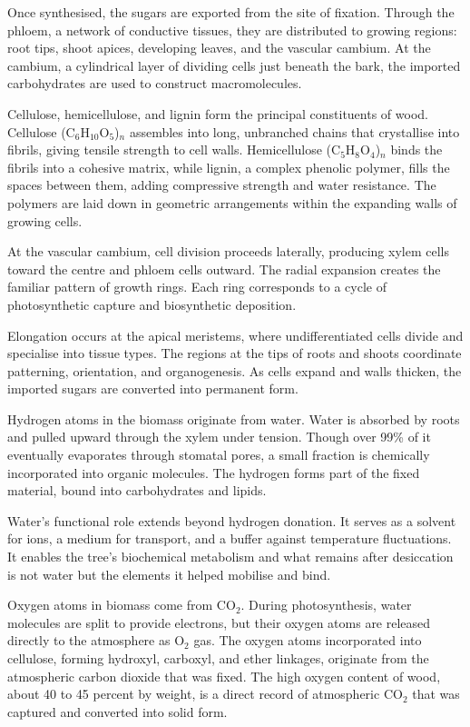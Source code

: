 Once synthesised, the sugars are exported from the site of fixation. Through the phloem, a network of conductive tissues, they are distributed to growing regions: root tips, shoot apices, developing leaves, and the vascular cambium. At the cambium, a cylindrical layer of dividing cells just beneath the bark, the imported carbohydrates are used to construct macromolecules.

Cellulose, hemicellulose, and lignin form the principal constituents of wood. Cellulose (C\(_6\)H\(_{10}\)O\(_5\))\(_n\) assembles into long, unbranched chains that crystallise into fibrils, giving tensile strength to cell walls. Hemicellulose (C\(_5\)H\(_{8}\)O\(_4\))\(_n\) binds the fibrils into a cohesive matrix, while lignin, a complex phenolic polymer, fills the spaces between them, adding compressive strength and water resistance. The polymers are laid down in geometric arrangements within the expanding walls of growing cells.

At the vascular cambium, cell division proceeds laterally, producing xylem cells toward the centre and phloem cells outward. The radial expansion creates the familiar pattern of growth rings. Each ring corresponds to a cycle of photosynthetic capture and biosynthetic deposition.

Elongation occurs at the apical meristems, where undifferentiated cells divide and specialise into tissue types. The regions at the tips of roots and shoots coordinate patterning, orientation, and organogenesis. As cells expand and walls thicken, the imported sugars are converted into permanent form.

Hydrogen atoms in the biomass originate from water. Water is absorbed by roots and pulled upward through the xylem under tension. Though over 99\% of it eventually evaporates through stomatal pores, a small fraction is chemically incorporated into organic molecules. The hydrogen forms part of the fixed material, bound into carbohydrates and lipids.

Water's functional role extends beyond hydrogen donation. It serves as a solvent for ions, a medium for transport, and a buffer against temperature fluctuations. It enables the tree's biochemical metabolism and what remains after desiccation is not water but the elements it helped mobilise and bind.

Oxygen atoms in biomass come from \(\mathrm{CO}_2\). During photosynthesis, water molecules are split to provide electrons, but their oxygen atoms are released directly to the atmosphere as \(\mathrm{O}_2\) gas. The oxygen atoms incorporated into cellulose, forming hydroxyl, carboxyl, and ether linkages, originate from the atmospheric carbon dioxide that was fixed. The high oxygen content of wood, about 40 to 45 percent by weight, is a direct record of atmospheric \(\mathrm{CO}_2\) that was captured and converted into solid form.

